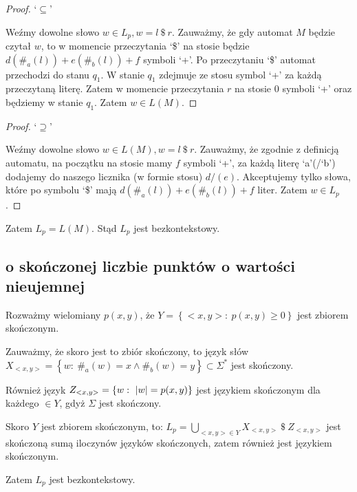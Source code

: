 \documentclass{article}
\theoremstyle{definition}
\theoremstyle{remark}
\begin{document}
\begin{proof}
    `\(\subseteq\)'

    Weźmy dowolne słowo \(w \in L_p, w = l \ \$ \ r\).
    Zauważmy, że gdy automat \(M\) będzie czytał \(w\),
    to w momencie przeczytania `\$' na stosie będzie \(d(\#_{a}(l))+e(\#_{b}(l))+f\) symboli `+'.
    Po przeczytaniu `\$' automat przechodzi do stanu \(q_1\).
    W stanie \(q_1\) zdejmuje ze stosu symbol `+' za każdą przeczytaną literę.
    Zatem w momencie przeczytania \(r\) na stosie 0 symboli `+' oraz będziemy w stanie \(q_1\).
    Zatem \(w \in L(M)\).
\end{proof}
\begin{proof}
    `\(\supseteq\)'

    Weźmy dowolne słowo \(w \in L(M), w = l \ \$ \ r\).
    Zauważmy, że zgodnie z definicją automatu,
    na początku na stosie mamy \(f\) symboli `+',
    za każdą literę `a'(/`b') dodajemy do naszego licznika (w formie stosu) \(d/(e)\).
    Akceptujemy tylko słowa, które po symbolu `\$' mają \(d(\#_{a}(l))+e(\#_{b}(l))+f\) liter.
    Zatem \(w \in L_p\).
\end{proof}

Zatem \(L_p = L(M)\).
Stąd \(L_p\) jest bezkontekstowy.

\subsection{o skończonej liczbie punktów o wartości nieujemnej}

Rozważmy wielomiany \(p(x,y)\), że \( Y = \left\{ <x,y>: \ p(x,y) \geq 0 \right\}\) jest zbiorem skończonym.

Zauważmy, że skoro jest to zbiór skończony, to język słów \( X_{<x,y>} = \left\{ w: \ \#_a(w) = x \land \#_b(w) = y \right\} \subset \Sigma^* \) jest skończony.

Również język \(Z_{<x,y>} = \left\{ w: \ \abs{w} = p(x,y) \right\}\) jest językiem skończonym dla każdego \(<x,y> \in Y\), gdyż \(\Sigma\) jest skończony.

Skoro \(Y\) jest zbiorem skończonym, to: 
\(L_p = \bigcup_{<x,y> \in Y} {X_{<x,y>}\ \$ \ Z_{<x,y>}} \) jest skończoną sumą iloczynów języków skończonych, zatem również jest językiem skończonym.

Zatem \(L_p\) jest bezkontekstowy.
\end{document}
